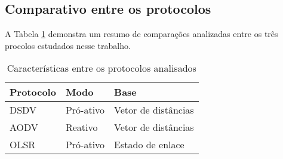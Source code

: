 \subsection{Comparativo entre os protocolos} 
A Tabela \ref{tabCompProt} demonstra um resumo de compara\c{c}\~oes analizadas entre os tr\^es procolos estudados nesse trabalho.

\begin{table}[H]
	\centering
	\caption{Caracter\'isticas entre os protocolos analisados}
	\begin{tabular}{ | l | l | l | }
		\hline
		Protocolo & Modo & Base \\ \hline
		DSDV & Pr\'o-ativo & Vetor de dist\^ancias \\ \hline
		AODV & Reativo & Vetor de dist\^ancias \\ \hline
		OLSR & Pr\'o-ativo & Estado de enlace \\ \hline
	\end{tabular}
	\label{tabCompProt}
\end{table}